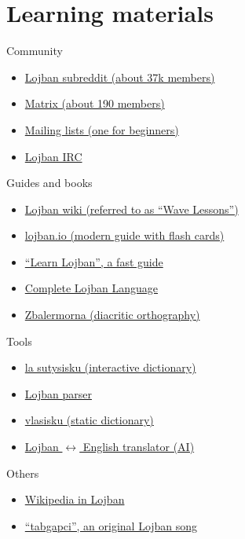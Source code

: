 \section{Learning materials}
\begin{frame}{Community}
    \begin{itemize}
        \item \href{https://www.reddit.com/r/lojban}{Lojban subreddit (about 37k members)}
        \item \href{https://matrix.to/\#/\#lojban:libera.chat}{Matrix (about 190 members)}
        \item \href{https://mw.lojban.org/papri/Lojban\#Mailing_lists}{Mailing lists (one for beginners)}
        \item \href{https://tiki.lojban.org/Lojban+IRC}{Lojban IRC}
    \end{itemize}
\end{frame}

\begin{frame}{Guides and books}
    \begin{itemize}
        \item \href{https://mw.lojban.org/}{Lojban wiki (referred to as ``Wave Lessons'')}
        \item \href{https://lojban.io/}{lojban.io (modern guide with flash cards)}
        \item \href{https://lojban.pw/books/learn-lojban/}{``Learn Lojban'', a fast guide}
        \item \href{https://github.com/lojban/cll/}{Complete Lojban Language}
        \item \href{https://jackhumbert.github.io/zbalermorna/}{Zbalermorna (diacritic orthography)}
    \end{itemize}
\end{frame}

\begin{frame}{Tools}
    \begin{itemize}
        \item \href{https://la-lojban.github.io/sutysisku/}{la sutysisku (interactive dictionary)}
        \item \href{https://lojban.github.io/ilmentufa/glosser/glosser.htm}{Lojban parser}
        \item \href{https://vlasisku.lojban.org/}{vlasisku (static dictionary)}
        \item \href{https://github.com/olpa/zmifanva}{Lojban $\leftrightarrow$ English translator (AI)}
    \end{itemize}
\end{frame}

\begin{frame}{Others}
    \begin{itemize}
        \item \href{https://jbo.wikipedia.org/wiki/uikipedi\%27as:ralju}{Wikipedia in Lojban}
        \item \href{https://youtu.be/ra4ID_TUJjo}{``tabgapci'', an original Lojban song}
    \end{itemize}
\end{frame}
